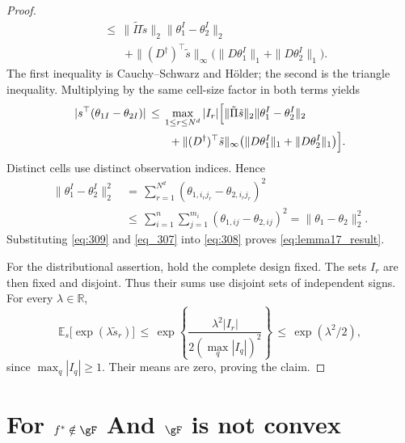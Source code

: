 \documentclass[twoside,11pt]{article}
\newenvironment{revision}{\color{revisionred}}{}
\begin{document}
\begin{revision}
\begin{proof}
\begin{align*}
&\,\leq\,\|\tilde\Pi\tilde s\|_2\|\theta_1^I-\theta_2^I\|_2\\
&\qquad+\|(D^\dag)^\top\tilde s\|_\infty
                \bigl(\|D\theta_1^I\|_1+\|D\theta_2^I\|_1\bigr).
\end{align*}
The first inequality is Cauchy--Schwarz and H\"older; the second
is the triangle inequality. Multiplying by the same cell-size
factor in both terms yields
\begin{equation}
\label{eq:308}
\begin{aligned}
|s^\top(\theta_{1I}-\theta_{2I})|
&\,\leq\,\max_{1\leq r\leq N^d}|I_r|
 \Bigl[\|\tilde\Pi\tilde s\|_2\|\theta_1^I-\theta_2^I\|_2\\
&\qquad+\|(D^\dag)^\top\tilde s\|_\infty
          \bigl(\|D\theta_1^I\|_1+\|D\theta_2^I\|_1\bigr)\Bigr].
\end{aligned}
\end{equation}
Distinct cells use distinct observation indices. Hence
\begin{equation}
\label{eq:309}
\begin{aligned}
\|\theta_1^I-\theta_2^I\|_2^2
&\,=\,\sum_{r=1}^{N^d}
                 (\theta_{1,i_rj_r}-\theta_{2,i_rj_r})^2\\
&\,\leq\,\sum_{i=1}^n\sum_{j=1}^{m_i}
                 (\theta_{1,ij}-\theta_{2,ij})^2
=\|\theta_1-\theta_2\|_2^2.
\end{aligned}
\end{equation}
Substituting \eqref{eq:309} and \eqref{eq_307} into
\eqref{eq:308} proves \eqref{eq:lemma17_result}.

For the distributional assertion, hold the complete design fixed.
The sets $I_r$ are then fixed and disjoint. Thus their sums use
disjoint sets of independent signs. For every $\lambda\in\mathbb R$,
\[
\mathbb E_s\bigl[\exp(\lambda\tilde s_r)\bigr]
\,\leq\,
\exp\left\{\frac{\lambda^2|I_r|}
 {2(\max_q|I_q|)^2}\right\}
\,\leq\,\exp(\lambda^2/2),
\]
since $\max_q|I_q|\geq1$. Their means are zero, proving the claim.
\end{proof}
\end{revision}






% 

\section{For $f^\ast \notin \gF$ And $\gF$ is not convex}
\end{document}
